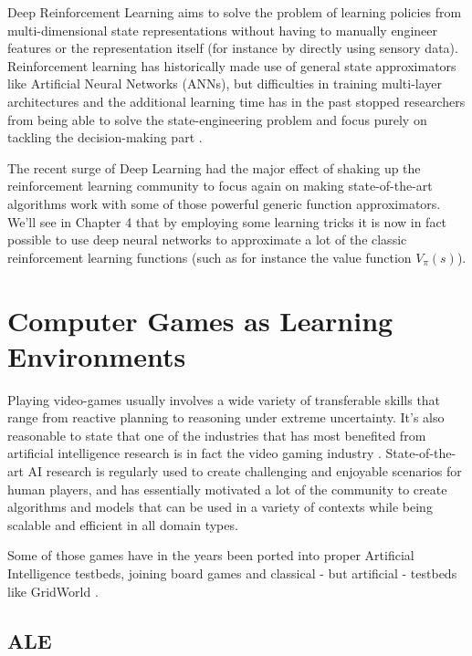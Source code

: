 Deep Reinforcement Learning aims to solve the problem of learning policies from
multi-dimensional state representations without having to manually engineer
features or the representation itself (for instance by directly using sensory
data). Reinforcement learning has historically made use of general state
approximators like Artificial Neural Networks (ANNs), but difficulties in
training multi-layer architectures and the additional learning time has in the
past stopped researchers from being able to solve the state-engineering problem
and focus purely on tackling the decision-making part \citep{melo2008analysis}.

The recent surge of Deep Learning had the major effect of shaking up the
reinforcement learning community to focus again on making state-of-the-art
algorithms work with some of those powerful generic function approximators.
We'll see in Chapter 4 that by employing some learning tricks it is now in fact
possible to use deep neural networks to approximate a lot of the classic
reinforcement learning functions (such as for instance the value function
$V_{\pi}(s)$).

\section{Computer Games as Learning Environments}

Playing video-games usually involves a wide variety of transferable skills that
range from reactive planning to reasoning under extreme uncertainty. It's also
reasonable to state that one of the industries that has most benefited from
artificial intelligence research is in fact the video gaming industry
\citep{laird2001human}. State-of-the-art AI research is regularly used to create
challenging and enjoyable scenarios for human players, and has essentially
motivated a lot of the community to create algorithms and models that can be
used in a variety of contexts while being scalable and efficient in all domain
types.

Some of those games have in the years been ported into proper Artificial
Intelligence testbeds, joining board games and classical - but artificial -
testbeds like GridWorld \citep{russell1995modern}.


\subsection{ALE}

